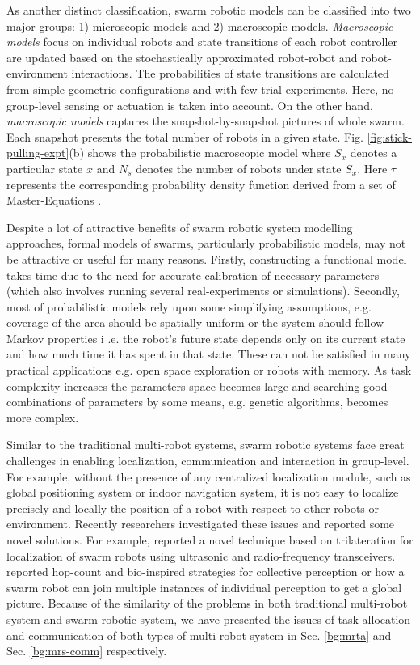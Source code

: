 As another distinct classification, swarm robotic models can be classified into two major groups: 1) microscopic models and 2) macroscopic models. {\em Macroscopic models} focus on individual robots and state transitions of each robot controller are updated based on the stochastically approximated robot-robot and robot-environment interactions. The probabilities of state transitions are calculated from simple geometric configurations and with few trial experiments. Here, no group-level sensing or actuation is taken into account. On the other hand, {\em macroscopic models} captures the snapshot-by-snapshot pictures of whole swarm. Each snapshot presents the total number of robots in a given state. Fig. \ref{fig:stick-pulling-expt}(b) shows the probabilistic macroscopic model where $S_{x}$ denotes a particular state $x$ and $N_{s}$ denotes the number of robots under state $S_{x}$. Here $\tau$ represents the corresponding probability density function derived from a set of Master-Equations \cite{Agassounon+2004}.

Despite a lot of attractive benefits of swarm robotic system modelling approaches, formal models of swarms, particularly probabilistic models, may not be attractive or useful for many reasons. Firstly, constructing a functional model takes time due to the need for accurate calibration of necessary parameters (which also involves running several real-experiments or simulations). 
Secondly, most of probabilistic models rely upon some simplifying assumptions, e.g. coverage of the area should be spatially uniform or the system should follow Markov properties i .e. the robot's future state depends only on its current state and how much time it has spent in that state. These can not be satisfied in many practical applications e.g. open space exploration or robots with memory. As task complexity increases the parameters space becomes large and searching good combinations of parameters by some means, e.g. genetic algorithms, becomes more complex.

Similar to the traditional multi-robot systems, swarm robotic systems face great challenges in enabling localization, communication and  interaction in group-level. For example, without the presence of any centralized localization module, such as global positioning system or indoor navigation system, it is not easy to localize precisely and locally the position of a robot with respect to other robots or environment. Recently researchers investigated  these issues and reported some  novel solutions. For example,  reported a novel technique based on trilateration for localization of swarm robots using ultrasonic and radio-frequency transceivers.  reported hop-count and bio-inspired strategies for collective perception or how a swarm robot can join multiple instances of individual perception to get a global picture. Because of the similarity of the problems in both traditional multi-robot system and swarm robotic system, we have presented the issues of  task-allocation and communication of both types of multi-robot system in Sec. \ref{bg:mrta} and Sec. \ref{bg:mrs-comm} respectively.

